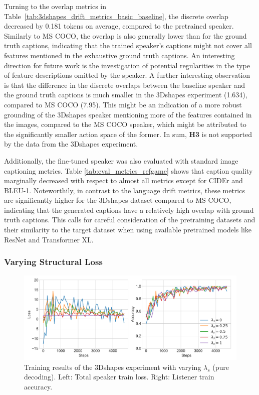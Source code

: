 Turning to the overlap metrics in Table~\ref{tab:3dshapes_drift_metrics_basic_baseline}, the discrete overlap decreased by 0.181 tokens on average, compared to the pretrained speaker. Similarly to MS COCO, the overlap is also generally lower than for the ground truth captions, indicating that the trained speaker's captions might not cover all features mentioned in the exhaustive ground truth captions. An interesting direction for future work is the investigation of potential regularities in the type of feature descriptions omitted by the speaker. A further interesting observation is that the difference in the discrete overlaps between the baseline speaker and the ground truth captions is much smaller in the 3Dshapes experiment (1.634), compared to MS COCO (7.95). This might be an indication of a more robust grounding of the 3Dshapes speaker mentioning more of the features contained in the images, compared to the MS COCO speaker, which might be attributed to the significantly smaller action space of the former. In sum, \textbf{H3} is not supported by the data from the 3Dshapes experiment.


Additionally, the fine-tuned speaker was also evaluated with standard image captioning metrics. Table \ref{tab:eval_metrics_refgame} shows that caption quality marginally decreased with respect to almost all metrics except for CIDEr and BLEU-1. Noteworthily, in contrast to the language drift metrics, these metrics are significantly higher for the 3Dshapes dataset compared to MS COCO, indicating that the generated captions have a relatively high overlap with ground truth captions. This calls for careful consideration of the pretraining datasets and their similarity to the target dataset when using available pretrained models like ResNet and Transformer XL.

\subsubsection{Varying Structural Loss}

\begin{figure}[h]
	\centering
	\includegraphics[width=\linewidth]{images/shapes_refgame_49_pure_losses_all_Ls_random.png}
	\caption{Training results of the 3Dshapes experiment with varying $\lambda_s$ (pure decoding). Left: Total speaker train loss. Right: Listener train accuracy.}
	\label{fig:3dshapes_baseline_speaker_loss_listener_acc_all}
\end{figure}


